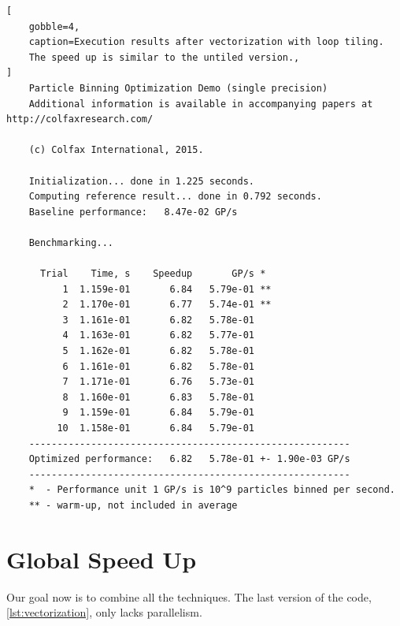 \documentclass[
    12pt, %
]{fphw}
\begin{document}
\begin{lstlisting}[
    gobble=4,
    caption=Execution results after vectorization with loop tiling.
    The speed up is similar to the untiled version.,
]
    Particle Binning Optimization Demo (single precision)
    Additional information is available in accompanying papers at http://colfaxresearch.com/

    (c) Colfax International, 2015.

    Initialization... done in 1.225 seconds.
    Computing reference result... done in 0.792 seconds.
    Baseline performance:   8.47e-02 GP/s

    Benchmarking...

      Trial    Time, s    Speedup       GP/s *
          1  1.159e-01       6.84   5.79e-01 **
          2  1.170e-01       6.77   5.74e-01 **
          3  1.161e-01       6.82   5.78e-01 
          4  1.163e-01       6.82   5.77e-01 
          5  1.162e-01       6.82   5.78e-01 
          6  1.161e-01       6.82   5.78e-01 
          7  1.171e-01       6.76   5.73e-01 
          8  1.160e-01       6.83   5.78e-01 
          9  1.159e-01       6.84   5.79e-01 
         10  1.158e-01       6.84   5.79e-01 
    ---------------------------------------------------------
    Optimized performance:   6.82   5.78e-01 +- 1.90e-03 GP/s
    ---------------------------------------------------------
    *  - Performance unit 1 GP/s is 10^9 particles binned per second.
    ** - warm-up, not included in average

\end{lstlisting}

\section{Global Speed Up}

    Our goal now is to combine all the techniques.
The last version of the code, \cref{lst:vectorization},
only lacks parallelism.
\end{document}

